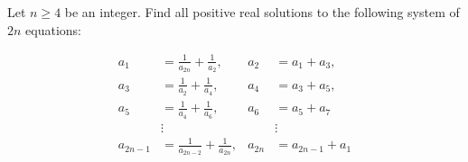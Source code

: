 Let $n \geq 4$ be an integer. Find all positive real solutions to the following system of $2n$ equations:

\begin{align*}
a_{1} &=\frac{1}{a_{2 n}}+\frac{1}{a_{2}}, & a_{2}&=a_{1}+a_{3}, \\
a_{3}&=\frac{1}{a_{2}}+\frac{1}{a_{4}}, & a_{4}&=a_{3}+a_{5}, \\
a_{5}&=\frac{1}{a_{4}}+\frac{1}{a_{6}}, & a_{6}&=a_{5}+a_{7} \\
&\vdots & &\vdots \\
a_{2 n-1}&=\frac{1}{a_{2 n-2}}+\frac{1}{a_{2 n}}, & a_{2 n}&=a_{2 n-1}+a_{1}
\end{align*}